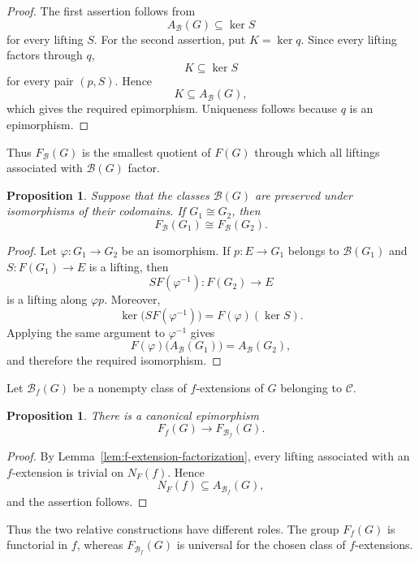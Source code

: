 \documentclass[10pt]{amsart}
\newtheorem{proposition}[theorem]{Proposition}
\renewcommand{\phi}{\varphi}
\renewcommand{\*}{\cdot {\dots} \cdot}
\newcommand{\?}[1]{\overset{?}{#1}}
\numberwithin{equation}{section}
\begin{document}
\begin{proof}
The first assertion follows from
\[
A_{\mathcal B}(G)\subseteq\ker S
\]
for every lifting $S$. For the second assertion, put $K=\ker q$.
Since every lifting factors through $q$,
\[
K\subseteq\ker S
\]
for every pair $(p,S)$. Hence
\[
K\subseteq A_{\mathcal B}(G),
\]
which gives the required epimorphism. Uniqueness follows because
$q$ is an epimorphism.
\end{proof}

Thus $F_{\mathcal B}(G)$ is the smallest quotient of $F(G)$
through which all liftings associated with $\mathcal B(G)$
factor.

\begin{proposition}\label{prop:universal-quotient-isomorphism}
Suppose that the classes $\mathcal B(G)$ are preserved under
isomorphisms of their codomains. If $G_1\cong G_2$, then
\[
F_{\mathcal B}(G_1)\cong F_{\mathcal B}(G_2).
\]
\end{proposition}

\begin{proof}
Let $\phi\colon G_1\to G_2$ be an isomorphism. If
$p\colon E\to G_1$ belongs to $\mathcal B(G_1)$ and
$S\colon F(G_1)\to E$ is a lifting, then
\[
SF(\phi^{-1})\colon F(G_2)\longrightarrow E
\]
is a lifting along $\phi p$. Moreover,
\[
\ker\bigl(SF(\phi^{-1})\bigr)=F(\phi)(\ker S).
\]
Applying the same argument to $\phi^{-1}$ gives
\[
F(\phi)\bigl(A_{\mathcal B}(G_1)\bigr)
=A_{\mathcal B}(G_2),
\]
and therefore the required isomorphism.
\end{proof}

Let $\mathcal B_f(G)$ be a nonempty class of $f$-extensions of
$G$ belonging to $\mathcal C$.

\begin{proposition}\label{prop:relative-universal-comparison}
There is a canonical epimorphism
\[
F_f(G)\longrightarrow F_{\mathcal B_f}(G).
\]
\end{proposition}

\begin{proof}
By Lemma~\ref{lem:f-extension-factorization}, every lifting
associated with an $f$-extension is trivial on $N_F(f)$. Hence
\[
N_F(f)\subseteq A_{\mathcal B_f}(G),
\]
and the assertion follows.
\end{proof}

Thus the two relative constructions have different roles. The
group $F_f(G)$ is functorial in $f$, whereas
$F_{\mathcal B_f}(G)$ is universal for the chosen class of
$f$-extensions.
\end{document}
